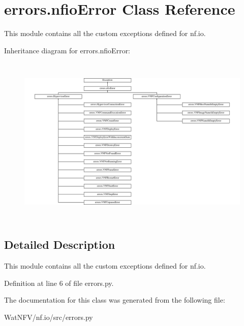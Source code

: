 \hypertarget{classerrors_1_1nfioError}{\section{errors.\-nfio\-Error Class Reference}
\label{classerrors_1_1nfioError}
}


This module contains all the custom exceptions defined for nf.\-io.  


Inheritance diagram for errors.\-nfio\-Error\-:\begin{figure}[H]
\begin{center}
\leavevmode
\includegraphics[height=8.205128cm]{classerrors_1_1nfioError}
\end{center}
\end{figure}


\subsection{Detailed Description}
This module contains all the custom exceptions defined for nf.\-io. 

Definition at line 6 of file errors.\-py.



The documentation for this class was generated from the following file\-:\begin{DoxyCompactItemize}
\item 
Wat\-N\-F\-V/nf.\-io/src/errors.\-py\end{DoxyCompactItemize}
